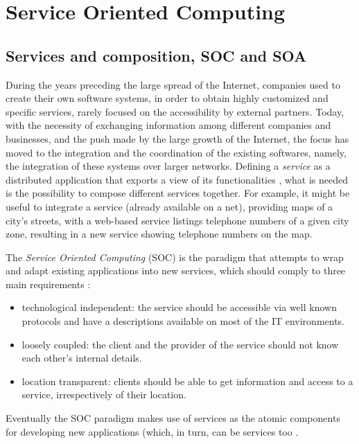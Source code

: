 \section{Service Oriented Computing}
\label{ServiceOrientedComputing}

\subsection{Services and composition, SOC and SOA}
\label{SOC&SOA}
During the years preceding the large spread of the Internet, companies used to create their own software systems, in order to obtain highly customized and specific services, rarely focused on the accessibility by external partners.
Today, with the necessity of exchanging information among different companies and businesses, and the push made by the large growth of the Internet, the focus has moved to the integration and the coordination of the existing softwares, namely, the integration of these systems over larger networks.
Defining a \textit{service} as a distributed application that exports a view of its functionalities  \cite{DiLorenzo08}, what is needed is the possibility to compose different services together.
For example, it might be useful to integrate a service (already available on a net), providing maps of a city's streets, with a web-based service listings telephone numbers of a given city zone, resulting in a new service showing telephone numbers on the map. %
  
The \textit{Service Oriented Computing} (SOC) is the paradigm that attempts to wrap and adapt existing applications into new services, which should comply to three main requirements \cite{DiLorenzo08,Papazoglou03}:
\begin{itemize}
 \item technological independent: the service should be accessible via well known protocols and have a descriptions available on most of the IT environments.
 \item loosely coupled: the client and the provider of the service should not know each other's internal details.
 \item location transparent: clients should be able to get information and access to a service, irrespectively of their location. 
\end{itemize}
Eventually the SOC paradigm makes use of services as the atomic components for developing new applications (which, in turn, can be services too \cite{Papazoglou03}.


